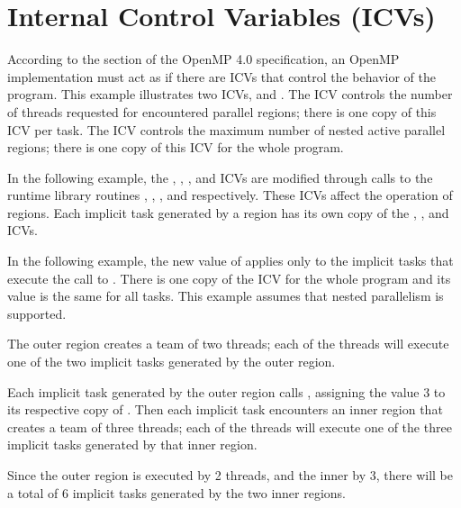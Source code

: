 \section{Internal Control Variables (ICVs)}
\label{sec:icv}

According to the  section of the OpenMP 4.0 specification, an OpenMP implementation must act as if there are ICVs that control 
the behavior of the program.  This example illustrates two ICVs,  
and . The  ICV controls the 
number of threads requested for encountered parallel regions; there is one copy 
of this ICV per task. The  ICV controls the maximum 
number of nested active parallel regions; there is one copy of this ICV for the 
whole program.

In the following example, the , , 
, and  ICVs are modified through calls to 
the runtime library routines , , , and  respectively. These ICVs 
affect the operation of  regions. Each implicit task generated 
by a  region has its own copy of the , ,
and  ICVs.

In the following example, the new value of  applies only to 
the implicit tasks that execute the call to . There 
is one copy of the  ICV for the whole program and 
its value is the same for all tasks. This example assumes that nested parallelism 
is supported.

The outer  region creates a team of two threads; each of the threads 
will execute one of the two implicit tasks generated by the outer  
region.

Each implicit task generated by the outer  region calls , 
assigning the value 3 to its respective copy of . Then each 
implicit task encounters an inner  region that creates a team 
of three threads; each of the threads will execute one of the three implicit tasks 
generated by that inner  region.

Since the outer  region is executed by 2 threads, and the inner 
by 3, there will be a total of 6 implicit tasks generated by the two inner  
regions.

